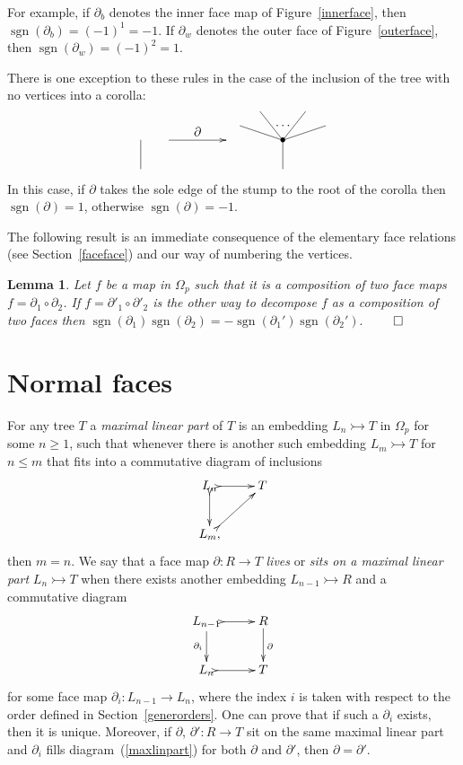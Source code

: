 \documentclass[a4paper]{amsart}
\theoremstyle{plain}
\newtheorem{lem}[thm]{Lemma}
\theoremstyle{definition}
\theoremstyle{remark}
\DeclareMathOperator{\sgn}{sgn}
\newcommand{\rpd}{\Omega_p}
\newcommand{\To}{\longrightarrow}
\numberwithin{equation}{section}
\numberwithin{figure}{section}
\begin{document}
For example, if $\partial_b$ denotes the inner face map of Figure~\ref{innerface}, then $\sgn(\partial_b)=(-1)^1=-1$. If
$\partial_w$ denotes the outer face of Figure~\ref{outerface}, then $\sgn(\partial_w)=(-1)^2=1$.

There is one exception to these rules in the case of the inclusion of
the tree with no vertices into a corolla:
$$
    \xy<0.08cm,0cm>:
    (0,0)*{}="1";
    (0,10)*=0{}="2";
    (50,0)*=0{}="3";
    (50,10)*=0{\bullet}="4";
    (35,15)*=0{}="5";
    (42,20)*{}="6";
    (58,20)*{}="7";
    (65,15)*=0{}="8";
    (20,13)*{\partial};
    "1";"2" **\dir{-};
    "3";"4" **\dir{-};
    "4";"5" **\dir{-};
    "4";"6" **\dir{-};
    "4";"7" **\dir{-};
    "4";"8" **\dir{-};
    {\ar(10, 10)*{};(30,10)*{}};
    (50,15)*{\cdots};
    \endxy
$$
In this case, if $\partial$ takes the sole edge of the stump to the root of the corolla then $\sgn(\partial)=1$, otherwise
$\sgn(\partial)=-1$.

The following result is an immediate consequence of the elementary face relations (see Section~\ref{faceface}) and our
way of numbering the vertices.
\begin{lem}\label{decomp}
    Let $f$ be a map in $\rpd$ such that it is a composition of two face maps $f=\partial_1\circ\partial_2$.
    If $f=\partial'_1\circ\partial'_2$ is the other way to decompose $f$ as a composition of two faces then
    $\sgn(\partial_1)\sgn(\partial_2)=-\sgn(\partial_1')\sgn(\partial_2').$
    $\hfill\qed$
\end{lem}

\section{Normal faces}
For any tree $T$ a \emph{maximal linear part} of $T$ is an embedding $L_n\rightarrowtail T$
in $\rpd$ for some $n\ge 1$, such that whenever there is another such embedding $L_m\rightarrowtail T$ for $n\le m$ that fits into a commutative diagram of inclusions
$$
    \xymatrix{L_n\ar@{>->}[r]\ar@{>->}[d]&T\\
        L_m,\ar@{>->}[ru]}
$$
then $m=n$. We say that a face map $\partial\colon R\To T$ \emph{lives} or \emph{sits on a maximal linear part}
$L_n\rightarrowtail T$ when there exists another embedding $L_{n-1}\rightarrowtail R$ and a commutative diagram
\begin{equation}
    \label{maxlinpart}
    \xymatrix{L_{n-1}\ar@{>->}[r]\ar[d]_{\partial_i} &R\ar[d]^\partial\\
        L_{n}\ar@{>->}[r] & T}
\end{equation}
for some face map $\partial_i:L_{n-1}\longrightarrow  L_n$, where the index $i$ is taken with respect to the order defined in
Section~\ref{generorders}. One can prove that if such a $\partial_i$ exists, then it is unique. Moreover, if $\partial$, $\partial'\colon R\To T$ sit on the same maximal linear part and $\partial_i$ fills diagram~(\ref{maxlinpart}) for both $\partial$ and $\partial'$, then $\partial=\partial'$.
\end{document}
